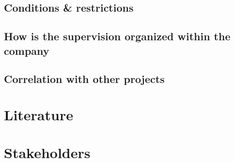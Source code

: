 \section{Conditions \& restrictions}
\section{How is the supervision organized within the company}
\section{Correlation with other projects}

\chapter{Literature}

\chapter{Stakeholders}


